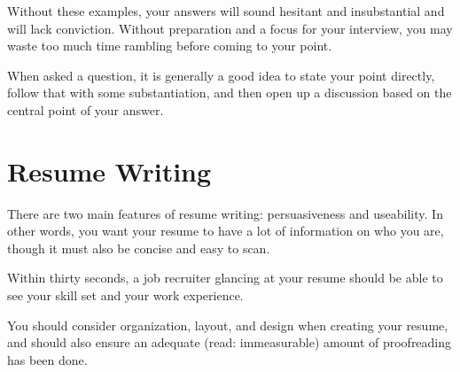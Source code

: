 \documentclass[12pt]{article}
\begin{document}
Without these examples, your answers will sound hesitant and insubstantial and will lack conviction. Without preparation and a focus for your interview, you may waste too much time rambling before coming to your point.

When asked a question, it is generally a good idea to state your point directly, follow that with some substantiation, and then open up a discussion based on the central point of your answer.

\section{Resume Writing}
There are two main features of resume writing: persuasiveness and useability. In other words, you want your resume to have a lot of information on who you are, though it must also be concise and easy to scan.

Within thirty seconds, a job recruiter glancing at your resume should be able to see your skill set and your work experience.

You should consider organization, layout, and design when creating your resume, and should also ensure an adequate (read: immeasurable) amount of proofreading has been done.
\end{document}
